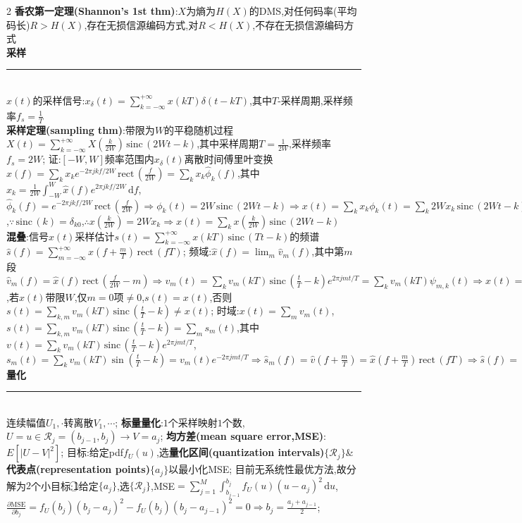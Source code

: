 \documentclass[UTF8,a4paper,10pt]{article}
\providecommand{\abs}[1]{\left\lvert#1\right\rvert}
\providecommand{\sinc}{\,\mathrm{sinc}\,}
\providecommand{\Pi}{\,\mathrm{rect}\,}
\begin{document}
\begin{multicols*}{2}
\textbf{香农第一定理(Shannon's 1st thm)}:$X$为熵为$H(X)$的DMS,对任何码率(平均码长)$R>H(X)$,存在无损信源编码方式,对$R<H(X)$,不存在无损信源编码方式\\
\textbf{采样}\rule{\columnwidth-}{.2pt}\\
$x(t)$的采样信号:$x_{\delta}(t)=\sum_{k=-\infty}^{+\infty}x(kT)\delta(t-kT)$,其中$T$-采样周期,采样频率$f_s=\frac{1}{T}$\\
\textbf{采样定理(sampling thm)}:带限为$W$的平稳随机过程$X(t)=\sum_{k=-\infty}^{+\infty}X(\frac{k}{2W})\sinc(2Wt-k)$,其中采样周期$T=\frac{1}{2W}$,采样频率$f_s=2W$;%
    证:$[-W,W]$频率范围内$x_{\delta}(t)$离散时间傅里叶变换$\hat{x}(f)=\sum_kx_ke^{-2\pi jkf/2W}\Pi(\frac{f}{2W})=\sum_kx_k\hat{\phi}_k(f)$,其中$x_k=\frac{1}{2W}\int_{-W}^W\hat{x}(f)e^{2\pi jkf/2W}\,\mathrm{d}f$,$\hat{\phi}_k(f)=e^{-2\pi jkf/2W}\Pi(\frac{f}{2W})\Rightarrow\phi_k(t)=2W\sinc(2Wt-k)\Rightarrow x(t)=\sum_kx_k\phi_k(t)=\sum_k2Wx_k\sinc(2Wt-k)$,$\because\sinc(k)=\delta_{k0}$,$\therefore x(\frac{k}{2W})=2Wx_k\Rightarrow x(t)=\sum_kx(\frac{k}{2W})\sinc(2Wt-k)$\\
\textbf{混叠}:信号$x(t)$采样估计$s(t)=\sum_{k=-\infty}^{+\infty}x(kT)\sinc(Tt-k)$的频谱$\hat{s}(f)=\sum_{m=-\infty}^{+\infty}\hat{x}(f+\frac{m}{T})\Pi(fT)$;%
    频域:$\hat{x}(f)=\lim_m\hat{v}_m(f)$,其中第$m$段$\hat{v}_m(f)=\hat{x}(f)\Pi(\frac{f}{2W}-m)\Rightarrow v_m(t)=\sum_kv_m(kT)\sinc(\frac{t}{T}-k)e^{2\pi jmt/T}=\sum_kv_m(kT)\psi_{m,k}(t)\Rightarrow x(t)=\sum_{m,k}v_m(kT)\sinc(\frac{t}{T}-k)e^{2\pi jmt/T}$,若$x(t)$带限$W$,仅$m=0$项$\neq 0$,$s(t)=x(t)$,否则$s(t)=\sum_{k,m}v_m(kT)\sinc(\frac{t}{T}-k)\neq x(t)$;%
    时域:$x(t)=\sum_mv_m(t)$,$s(t)=\sum_{k,m}v_m(kT)\sinc(\frac{t}{T}-k)=\sum_ms_m(t)$,其中$v(t)=\sum_kv_m(kT)\sinc(\frac{t}{T}-k)e^{2\pi jmt/T}$,$s_m(t)=\sum_kv_m(kT)\sin(\frac{t}{T}-k)=v_m(t)e^{-2\pi jmt/T}\Rightarrow\hat{s}_m(f)=\hat{v}(f+\frac{m}{T})=\hat{x}(f+\frac{m}{T})\Pi(fT)\Rightarrow\hat{s}(f)=\sum_m\hat{x}(f+\frac{m}{T})\Pi(fT)$\\
\textbf{量化}\rule{\columnwidth-}{.2pt}\\
连续幅值$U_1,\cdot$转离散$V_1,\cdots$;%
    \textbf{标量量化}:$1$个采样映射$1$个数,$U=u\in\mathcal{R}_j=(b_{j-1},b_j)\rightarrow V=a_j$;%
    \textbf{均方差(mean square error,MSE)}:$E[\abs{U-V}^2]$;%
    目标:给定pdf$f_U(u)$,选\textbf{量化区间(quantization intervals)}$\{\mathcal{R}_j\}$\&\textbf{代表点(representation points)}$\{a_j\}$以最小化MSE;%
    目前无系统性最优方法,故分解为$2$个小目标:\textcircled{1}给定$\{a_j\}$,选$\{\mathcal{R}_j\}$,MSE$=\sum_{j=1}^M\int_{b_{j-1}}^{b_j}f_U(u)(u-a_j)^2\,\mathrm{d}u$,$\frac{\partial\text{MSE}}{\partial b_j}=f_U(b_j)(b_j-a_j)^2-f_U(b_j)(b_j-a_{j-1})^2=0\Rightarrow b_j=\frac{a_j+a_{j-1}}{2}$;%

\end{multicols*}
\end{document}
